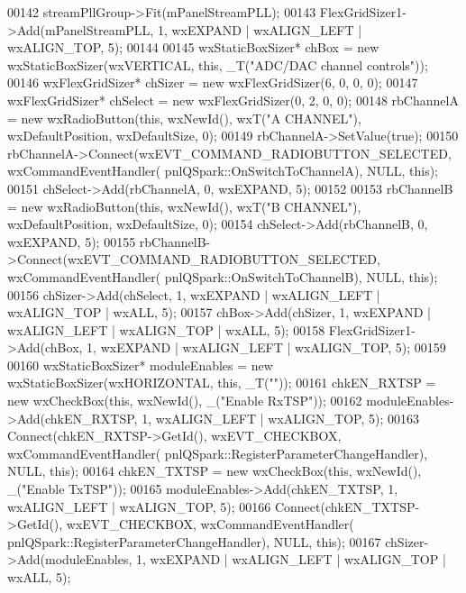 \begin{DoxyCode}
00142     streamPllGroup->Fit(mPanelStreamPLL);
00143     FlexGridSizer1->Add(mPanelStreamPLL, 1, wxEXPAND | wxALIGN\_LEFT | wxALIGN\_TOP, 5);
00144 
00145     wxStaticBoxSizer* chBox = \textcolor{keyword}{new} wxStaticBoxSizer(wxVERTICAL, \textcolor{keyword}{this}, \_T(\textcolor{stringliteral}{"ADC/DAC channel controls"}));
00146     wxFlexGridSizer* chSizer = \textcolor{keyword}{new} wxFlexGridSizer(6, 0, 0, 0);
00147     wxFlexGridSizer* chSelect = \textcolor{keyword}{new} wxFlexGridSizer(0, 2, 0, 0);
00148     rbChannelA = \textcolor{keyword}{new} wxRadioButton(\textcolor{keyword}{this}, wxNewId(), wxT(\textcolor{stringliteral}{"A CHANNEL"}), wxDefaultPosition, wxDefaultSize, 0);
00149     rbChannelA->SetValue(\textcolor{keyword}{true});
00150     rbChannelA->Connect(wxEVT\_COMMAND\_RADIOBUTTON\_SELECTED, wxCommandEventHandler(
      pnlQSpark::OnSwitchToChannelA), NULL, \textcolor{keyword}{this});
00151     chSelect->Add(rbChannelA, 0, wxEXPAND, 5);
00152 
00153     rbChannelB = \textcolor{keyword}{new} wxRadioButton(\textcolor{keyword}{this}, wxNewId(), wxT(\textcolor{stringliteral}{"B CHANNEL"}), wxDefaultPosition, wxDefaultSize, 0);
00154     chSelect->Add(rbChannelB, 0, wxEXPAND, 5);
00155     rbChannelB->Connect(wxEVT\_COMMAND\_RADIOBUTTON\_SELECTED, wxCommandEventHandler(
      pnlQSpark::OnSwitchToChannelB), NULL, \textcolor{keyword}{this});
00156     chSizer->Add(chSelect, 1, wxEXPAND | wxALIGN\_LEFT | wxALIGN\_TOP | wxALL, 5);
00157     chBox->Add(chSizer, 1, wxEXPAND | wxALIGN\_LEFT | wxALIGN\_TOP | wxALL, 5);
00158     FlexGridSizer1->Add(chBox, 1, wxEXPAND | wxALIGN\_LEFT | wxALIGN\_TOP, 5);
00159 
00160     wxStaticBoxSizer* moduleEnables = \textcolor{keyword}{new} wxStaticBoxSizer(wxHORIZONTAL, \textcolor{keyword}{this}, \_T(\textcolor{stringliteral}{""}));
00161     chkEN_RXTSP = \textcolor{keyword}{new} wxCheckBox(\textcolor{keyword}{this}, wxNewId(), \_(\textcolor{stringliteral}{"Enable RxTSP"}));
00162     moduleEnables->Add(chkEN_RXTSP, 1, wxALIGN\_LEFT | wxALIGN\_TOP, 5);
00163     Connect(chkEN_RXTSP->GetId(), wxEVT\_CHECKBOX, wxCommandEventHandler(
      pnlQSpark::RegisterParameterChangeHandler), NULL, \textcolor{keyword}{this});
00164     chkEN_TXTSP = \textcolor{keyword}{new} wxCheckBox(\textcolor{keyword}{this}, wxNewId(), \_(\textcolor{stringliteral}{"Enable TxTSP"}));
00165     moduleEnables->Add(chkEN\_TXTSP, 1, wxALIGN\_LEFT | wxALIGN\_TOP, 5);
00166     Connect(chkEN\_TXTSP->GetId(), wxEVT\_CHECKBOX, wxCommandEventHandler(
      pnlQSpark::RegisterParameterChangeHandler), NULL, \textcolor{keyword}{this});
00167     chSizer->Add(moduleEnables, 1, wxEXPAND | wxALIGN\_LEFT | wxALIGN\_TOP | wxALL, 5);

\end{DoxyCode}
